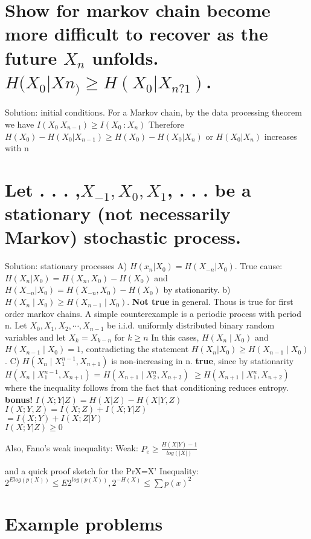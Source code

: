 \documentclass[10pt]{article}
\begin{document}
\begin{tiny}
\begin{multicols}{3}
\section*{Show for markov chain become more difficult to recover as the future $X_n$ unfolds. $H (X_0|Xn_) \ge H (X_0|X_{n?1})$.}
Solution: initial conditions. For a Markov chain, by the data processing theorem we have $I(X_0  \: X_{n-1}) \ge I(X_0 \ : X_n)$ Therefore $H(X_0) - H(X_0 | X_{n-1}) \ge H(X_0) - H(X_0 | X_n)$ or $H(X_0 | X_n)$  increases with n

\section*{Let	. . . ,$ X_{-1}, X_0, X_1$, . . . be	a stationary (not necessarily Markov) stochastic process.}
Solution: stationary processes A) $H(x_n | X_0) = H(X_{-n} | X_0).$ True cause: $H(X_n | X_0) = H(X_n,X_0) - H(X_0)$ and $H(X_{-n} | X_0) = H(X_{-n},X_0) - H(X_0)$ by stationarity.
b) \(H(X_n\mid X_0) \ge H(X_{n-1} \mid X_0). \) \textbf{Not true} in general. Thous is true for first order markov chains. A simple counterexample is a periodic process with period n. Let $X_0,X_1,X_2,\cdots,X_{n-1}$ be i.i.d. uniformly distributed binary random variables and let \(X_k =X_{k-n}\) for \( k \ge n \) In this cases, $H(X_n \mid X_0)$ and $H(X_{n-1} \mid X_0) = 1$, contradicting the statement $H(X_n | X_0) \ge H(X_{n-1} \mid X_0)$. C) \(H(X_n \mid X_1^{n-1}, X_{n+1}) \) is non-increasing in n. \textbf{true}, since by stationarity \(H(X_n \mid X_1^{n-1}, X_{n+1}) \) = \(H(X_{n+1} \mid X_2^{n}, X_{n+2}) \)  \( \ge H(X_{n+1} \mid X_1^{n}, X_{n+2}) \) where the inequality follows from the fact that conditioning reduces entropy.
\\
\textbf{bonus!}
$I(X;Y|Z) = H(X|Z) - H(X|Y,Z)$ \\
$I(X;Y,Z) = I(X;Z) + I(X;Y|Z) $\\
$            = I(X;Y) + I(X;Z|Y) $\\
$I(X;Y|Z) \geq 0$ 

Also,
Fano's weak inequality:
Weak: $P_e \geq \frac{H(X|Y)-1}{log(|X|)}$

and a quick proof sketch for the Pr{X=X'} Inequality:
$2^{Elog(p(X))} \leq E2^{log(p(X))}, 2^{-H(X)} \leq \sum p(x)^2$


\section*{Example problems}



\end{multicols}
\end{tiny}
\end{document}
